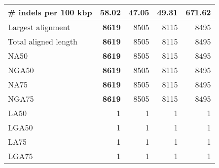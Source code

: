 \documentclass[12pt,a4paper]{article}
\begin{document}
\begin{table}[ht]
\begin{center}
\begin{tabular}{|l*{4}{|r}|}
\# indels per 100 kbp & 58.02 & {\bf 47.05} & 49.31 & 671.62 \\ \hline
Largest alignment & {\bf 8619} & 8505 & 8115 & 8495 \\ \hline
Total aligned length & {\bf 8619} & 8505 & 8115 & 8495 \\ \hline
NA50 & {\bf 8619} & 8505 & 8115 & 8495 \\ \hline
NGA50 & {\bf 8619} & 8505 & 8115 & 8495 \\ \hline
NA75 & {\bf 8619} & 8505 & 8115 & 8495 \\ \hline
NGA75 & {\bf 8619} & 8505 & 8115 & 8495 \\ \hline
LA50 & 1 & 1 & 1 & 1 \\ \hline
LGA50 & 1 & 1 & 1 & 1 \\ \hline
LA75 & 1 & 1 & 1 & 1 \\ \hline
LGA75 & 1 & 1 & 1 & 1 \\ \hline
\end{tabular}
\end{center}
\end{table}
\end{document}

